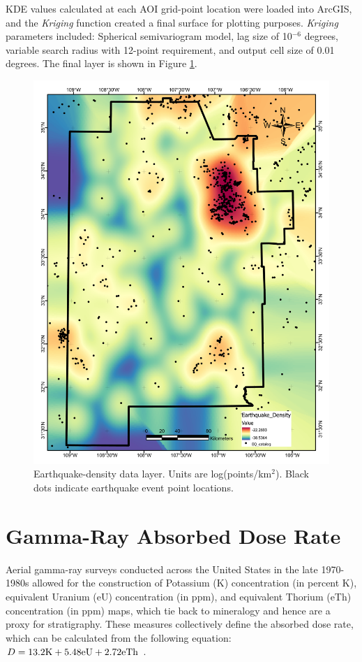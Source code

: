 KDE values calculated at each AOI grid-point location were loaded into ArcGIS, and the \textit{Kriging} function created a final surface for plotting purposes. \textit{Kriging} parameters included: Spherical semivariogram model, lag size of 10$^{-6}$ degrees, variable search radius with 12-point requirement, and output cell size of 0.01 degrees. The final layer is shown in Figure \ref{fig:feat_EQ_density}.

\begin{figure}[H]
\centering
\includegraphics[width=0.75\linewidth]{templates/images/Figure-EarthquakeDensity.pdf}
\caption[Earthquake density data layer]{Earthquake-density data layer. Units are log(points/km$^2$). Black dots indicate earthquake event point locations.}
\label{fig:feat_EQ_density}
\end{figure}

\section{Gamma-Ray Absorbed Dose Rate}\label{app:dl_gamma_dose}

Aerial gamma-ray surveys conducted across the United States in the late 1970-1980s allowed for the construction of Potassium (K) concentration (in percent K), equivalent Uranium (eU) concentration (in ppm), and equivalent Thorium (eTh) concentration (in ppm) maps, which tie back to mineralogy and hence are a proxy for stratigraphy. These measures collectively define the absorbed dose rate, which can be calculated from the following equation: $D = 13.2{\rm K} + 5.48{\rm eU} + 2.72{\rm eTh}$ \citep{duval_terrestrial_2005}.

